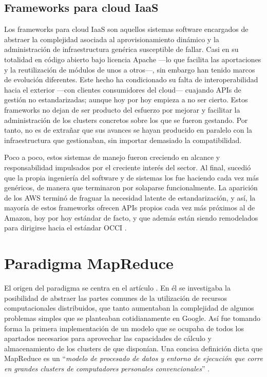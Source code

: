 \subsection{Frameworks para cloud IaaS}\label{subsec:frameworksiaas}

\noindent Los frameworks para cloud IaaS son aquellos sistemas software encargados de abstraer la complejidad asociada al aprovisionamiento din\'amico y la administraci\'on de infraestructura gen\'erica susceptible de fallar. Casi en su totalidad en c\'odigo abierto bajo licencia Apache ---lo que facilita las aportaciones y la reutilizaci\'on de m\'odulos de unos a otros---, sin embargo han tenido marcos de evoluci\'on diferentes. Este hecho ha condicionado su falta de in\-te\-ro\-pe\-ra\-bi\-li\-dad hacia el exterior ---con clientes consumidores del cloud--- cuajando APIs de gesti\'on no estandarizadas; aunque hoy por hoy empieza a no ser cierto. Estos frameworks no dejan de ser producto del esfuerzo por mejorar y facilitar la administraci\'on de los clusters concretos sobre los que se fueron gestando. Por tanto, no es de extra\~nar que sus avances se hayan producido en paralelo con la infraestructura que gestionaban, sin importar demasiado la compatibilidad.\newline

Poco a poco, estos sistemas de manejo fueron creciendo en alcance y res\-pon\-sa\-bi\-li\-dad impulsados por el creciente inter\'es del sector. Al final, sucedi\'o que la propia ingenier\'ia del software y de sistemas los fue haciendo cada vez m\'as gen\'ericos, de manera que terminaron por solaparse funcionalmente. La aparici\'on de los AWS termin\'o de fraguar la necesidad latente de estandarizaci\'on, y as\'i, la mayor\'ia de estos frameworks ofrecen APIs propios cada vez m\'as pr\'oximos al de Amazon, hoy por hoy est\'andar de facto, y que adem\'as est\'an siendo remodelados para dirigirse hacia el est\'andar OCCI \cite{occisdraft}.


\section{Paradigma MapReduce}\label{sec:mapred}
\noindent El origen del paradigma se centra en el art\'iculo \cite{googlemapreduce}. En \'el se investigaba la posibilidad de abstraer las partes comunes de la utilizaci\'on de recursos computacionales distribuidos, que tanto aumentaban la complejidad de algunos problemas simples que se planteaban cotidianamente en Google. As\'i fue tomando forma la primera implementaci\'on de un modelo que se ocupaba de todos los apartados necesarios para aprovechar las capacidades de c\'alculo y almacenamiento de los clusters de que dispon\'ian. Una concisa definici\'on dicta que MapReduce es un ``\textit{modelo de procesado de datos y entorno de ejecuci\'on que corre en grandes clusters de computadores personales convencionales}'' \cite{hadoopdefguide}.


